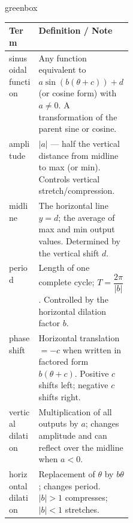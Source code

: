\documentclass[10pt]{article}
\begin{document}
\begin{skillbox}{greenbox}
\begin{tabularx}{\linewidth}{@{} p{0.24\linewidth} X @{}}
\textbf{Term} & \textbf{Definition / Note} \\
\midrule
sinusoidal function &
  Any function equivalent to $a\sin(b(\theta+c))+d$ (or cosine form)
  with $a\neq 0$. A transformation of the parent sine or cosine. \\[4pt]
amplitude &
  $|a|$ --- half the vertical distance from midline to max (or min).
  Controls vertical stretch/compression. \\[4pt]
midline &
  The horizontal line $y=d$; the average of max and min output values.
  Determined by the vertical shift $d$. \\[4pt]
period &
  Length of one complete cycle; $T=\dfrac{2\pi}{|b|}$.
  Controlled by the horizontal dilation factor $b$. \\[4pt]
phase shift &
  Horizontal translation $= -c$ when written in factored form
  $b(\theta+c)$. Positive $c$ shifts left; negative $c$ shifts right. \\[4pt]
vertical dilation &
  Multiplication of all outputs by $a$; changes amplitude and can
  reflect over the midline when $a<0$. \\[4pt]
horizontal dilation &
  Replacement of $\theta$ by $b\theta$; changes period.
  $|b|>1$ compresses; $|b|<1$ stretches. \\
\end{tabularx}
\end{skillbox}

\vspace{0.08in}
\end{document}
